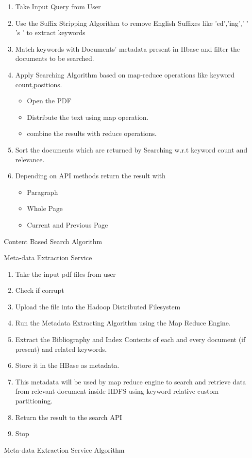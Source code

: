 \documentclass{IEEEtran}
\begin{document}
\begin{algorithm}[h]
\begin{enumerate}
\item Take Input Query from User
\item Use the Suffix Stripping Algorithm to remove English Suffixes like 'ed','ing',' ' 's ' to extract keywords
\item Match keywords with Documents' metadata present in Hbase and filter the documents to be searched.
\item Apply Searching Algorithm based on map-reduce operations like keyword count,positions.
\begin{itemize}
\item Open the PDF
\item Distribute the text using map operation.
\item combine the results with reduce operations.
\end{itemize} 
\item Sort the documents which are returned by Searching w.r.t keyword count and relevance.
\item Depending on API methods return the result with 
\begin{itemize}
\item Paragraph
\item Whole Page
\item Current and Previous Page
\end{itemize}
\end{enumerate}
\caption{Content Based Search Algorithm}
\end{algorithm}

\begin{algorithm}[h]
\SetAlgoLined
Meta-data Extraction Service
\begin{enumerate}
\item Take the input pdf files from user
\item Check if corrupt
\item Upload the file into the Hadoop Distributed Filesystem
\item Run the Metadata Extracting Algorithm using the Map Reduce Engine.
\item Extract the Bibliography and Index Contents of each and every document (if present) and related keywords.
\item Store it in the HBase as metadata.
\item This metadata will be used by map reduce engine to search and retrieve data from relevant document inside HDFS using keyword relative custom partitioning.
\item Return the result to the search API
\item Stop
\end{enumerate}
 \caption{Meta-data Extraction Service Algorithm}
\end{algorithm}
\end{document}

